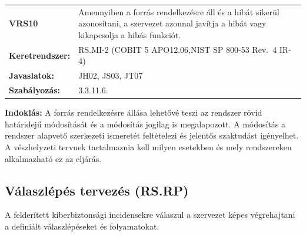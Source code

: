 \documentclass[12pt,magyar,a4paper,oneside]{scrreprt}
\begin{document}
\begin{longtable}[]{@{}ll@{}}
\toprule
\endhead
\begin{minipage}[t]{0.16\columnwidth}\raggedright
\textbf{VRS10}\strut
\end{minipage} & \begin{minipage}[t]{0.79\columnwidth}\raggedright
Amennyiben a forrás rendelkezésre áll és a hibát sikerül azonosítani, a
szervezet azonnal javítja a hibát vagy kikapcsolja a hibás
funkciót.\strut
\end{minipage}\tabularnewline
\begin{minipage}[t]{0.16\columnwidth}\raggedright
\textbf{Keretrendszer:}\strut
\end{minipage} & \begin{minipage}[t]{0.79\columnwidth}\raggedright
RS.MI-2 (COBIT 5 APO12.06,NIST SP 800-53 Rev.~4 IR-4)\strut
\end{minipage}\tabularnewline
\begin{minipage}[t]{0.16\columnwidth}\raggedright
\textbf{Javaslatok:}\strut
\end{minipage} & \begin{minipage}[t]{0.79\columnwidth}\raggedright
JH02, JS03, JT07\strut
\end{minipage}\tabularnewline
\begin{minipage}[t]{0.16\columnwidth}\raggedright
\textbf{Szabályozás:}\strut
\end{minipage} & \begin{minipage}[t]{0.79\columnwidth}\raggedright
3.3.11.6.\strut
\end{minipage}\tabularnewline
\bottomrule
\end{longtable}

\textbf{Indoklás: } A forrás rendelkezésre állása lehetővé teszi az
rendszer rövid határidejű módosítását és a módosítás jogilag is
megalapozott. A módosítás a rendszer alapvető szerkezeti ismeretét
feltételezi és jelentős szaktudást igényelhet. A vészhelyzeti tervnek
tartalmaznia kell milyen esetekben és mely rendszereken alkalmazható ez
az eljárás.

\hypertarget{vuxe1laszluxe9puxe9s-tervezuxe9s-rs.rp}{%
\subsection{Válaszlépés tervezés
(RS.RP)}\label{vuxe1laszluxe9puxe9s-tervezuxe9s-rs.rp}}

A felderített kiberbiztonsági incidensekre válaszul a szervezet képes
végrehajtani a definiált válaszlépéseket és folyamatokat.
\end{document}
